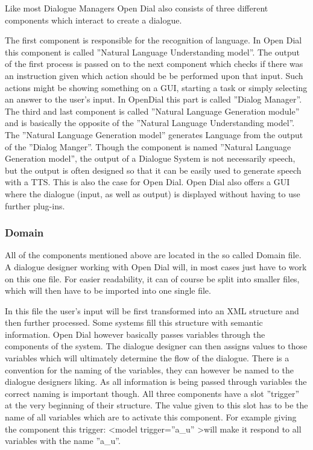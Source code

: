 \documentclass[a4paper, 12pt]{article}
\begin{document}
Like most Dialogue Managers Open Dial also consists of three different components which interact to create a dialogue. 

The first component is responsible for the recognition of language. 
In Open Dial this component is called ”Natural Language Understanding model”. 
The output of the first process is passed on to the next component which checks if there was an instruction given which action should be  be performed upon that input. 
Such actions might be showing something on a GUI, starting a task or simply selecting an answer to the user's input. 
In OpenDial this part is called ”Dialog Manager”.
The third and last component is called ”Natural Language Generation module” and is basically the opposite of the ”Natural Language Understanding model”. 
The ”Natural Language Generation model” generates Language from the output of the ”Dialog Manger”. 
Though the component is named ”Natural Language Generation model”, the output of a Dialogue System is not necessarily speech, but the output is often designed so that it can be easily used to generate speech with a TTS. 
This is also the case for Open Dial. 
Open Dial also offers a GUI where the dialogue (input, as well as output) is displayed without having to use further plug-ins.

\subsubsection{Domain}

All of the components mentioned above are located in the so called Domain file.
A dialogue designer working with Open Dial will, in most cases just have to work on this one file. 
For easier readability, it can of course be split into smaller files, which will then have to be imported into one single file. \newline

In this file the user's input will be first transformed into an XML structure and then further processed.
Some systems fill this structure with semantic information. 
Open Dial however basically passes variables through the components of the system. 
The dialogue designer can then assigns values to those variables which will ultimately determine the flow of the dialogue. 
There is a convention for the naming of the variables, they can however be named to the dialogue designers liking. 
As all information is being passed through variables the correct naming is important though. 
All three components have a slot ”trigger” at the very beginning of their structure. 
The value given to this slot has to be the name of all variables which are to activate this component.
For example giving the component this trigger: 
\textless model trigger=”a\_u” \textgreater will make it respond to all variables with the name ”a\_u”.  \newline
\end{document}
